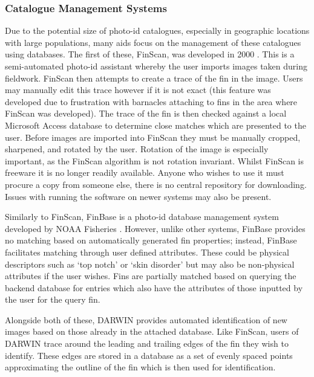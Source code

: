 \subsubsection{Catalogue Management Systems}\label{ch:Background,sec:conTech,sub:photoIDAides,subsub:databases}

Due to the potential size of photo-id catalogues, especially in geographic locations with large populations, many aids focus on the management of these catalogues using databases. The first of these, FinScan, was developed in 2000 \cite{hillman_finscan_2002}. This is a semi-automated photo-id assistant whereby the user imports images taken during fieldwork. FinScan then attempts to create a trace of the fin in the image. Users may manually edit this trace however if it is not exact (this feature was developed due to frustration with barnacles attaching to fins in the area where FinScan was developed). The trace of the fin is then checked against a local Microsoft Access database to determine close matches which are presented to the user. Before images are imported into FinScan they must be manually cropped, sharpened, and rotated by the user. Rotation of the image is especially important, as the FinScan algorithm is not rotation invariant. Whilst FinScan is freeware it is no longer readily available. Anyone who wishes to use it must procure a copy from someone else, there is no central repository for downloading. Issues with running the software on newer systems may also be present.

Similarly to FinScan, FinBase is a photo-id database management system developed by NOAA Fisheries \cite{fisheries_finbase_2018}. However, unlike other systems, FinBase provides no matching based on automatically generated fin properties; instead, FinBase facilitates matching through user defined attributes. These could be physical descriptors such as `top notch' or `skin disorder' but may also be non-physical attributes if the user wishes. Fins are partially matched based on querying the backend database for entries which also have the attributes of those inputted by the user for the query fin. 

Alongside both of these, DARWIN \cite{hale_unsupervised_2012} provides automated identification of new images based on those already in the attached database. Like FinScan, users of DARWIN trace around the leading and trailing edges of the fin they wish to identify. These edges are stored in a database as a set of evenly spaced points approximating the outline of the fin which is then used for identification.

